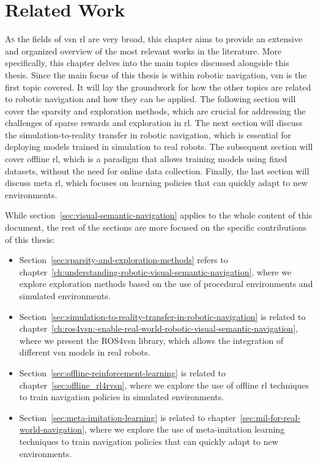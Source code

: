 \chapter{Related Work}\label{ch:related-work}

\lettrine{\textcolor{accent_color}{A}}{s} the fields of \acrshort{vsn} \acrshort{rl} are very broad, this chapter aims to provide an extensive and organized overview of the most relevant works in the literature.
More specifically, this chapter delves into the main topics discussed alongside this thesis.
Since the main focus of this thesis is within robotic navigation, \acrlong{vsn} is the first topic covered.
It will lay the groundwork for how the other topics are related to robotic navigation and how they can be applied.
The following section will cover the sparsity and exploration methods, which are crucial for addressing the challenges of sparse rewards and exploration in \acrshort{rl}.
The next section will discuss the simulation-to-reality transfer in robotic navigation, which is essential for deploying models trained in simulation to real robots.
The subsequent section will cover offline \acrshort{rl}, which is a paradigm that allows training models using fixed datasets, without the need for online data collection.
Finally, the last section will discuss meta \acrshort{rl}, which focuses on learning policies that can quickly adapt to new environments.

While section~\ref{sec:visual-semantic-navigation} applies to the whole content of this document, the rest of the sections are more focused on the specific contributions of this thesis:

\begin{itemize}
    \item Section~\ref{sec:sparsity-and-exploration-methods} refers to chapter~\ref{ch:understanding-robotic-visual-semantic-navigation}, where we explore exploration methods based on the use of procedural environments and simulated environments.
    \item Section~\ref{sec:simulation-to-reality-transfer-in-robotic-navigation} is related to chapter~\ref{ch:ros4vsn:-enable-real-world-robotic-visual-semantic-navigation}, where we present the ROS4\acrshort{vsn} library, which allows the integration of different \acrshort{vsn} models in real robots.
    \item Section~\ref{sec:offline-reinforcement-learning} is related to chapter~\ref{sec:offline_rl4rvsn}, where we explore the use of offline \acrshort{rl} techniques to train navigation policies in simulated environments.
    \item Section~\ref{sec:meta-imitation-learning} is related to chapter~\ref{sec:mil-for-real-world-navigation}, where we explore the use of meta-imitation learning techniques to train navigation policies that can quickly adapt to new environments.
\end{itemize}

